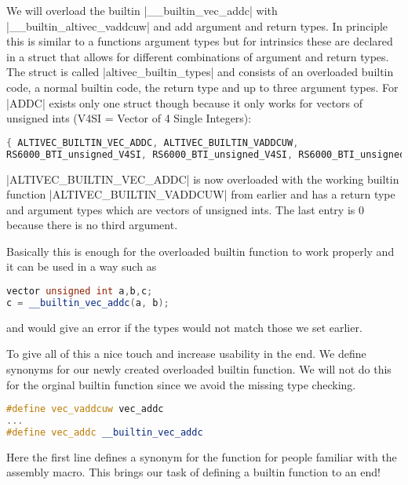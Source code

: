 We will overload the builtin |__builtin_vec_addc| with |__builtin_altivec_vaddcuw| and add argument and return types. In principle this is similar to a functions argument types but for intrinsics these are declared in a struct that allows for different combinations of argument and return types. The struct is called |altivec_builtin_types| and consists of an overloaded builtin code, a normal builtin code, the return type and up to three argument types. For |ADDC| exists only one struct though because it only works for vectors of unsigned ints (V4SI = Vector of 4 Single Integers):
\begin{lstlisting}[language=C++,basicstyle=\ttfamily\scriptsize,keywordstyle=\color{red}]
{ ALTIVEC_BUILTIN_VEC_ADDC, ALTIVEC_BUILTIN_VADDCUW,
RS6000_BTI_unsigned_V4SI, RS6000_BTI_unsigned_V4SI, RS6000_BTI_unsigned_V4SI, 0 }			
\end{lstlisting}
|ALTIVEC_BUILTIN_VEC_ADDC| is now overloaded with the working builtin function |ALTIVEC_BUILTIN_VADDCUW| from earlier and has a return type and argument types which are vectors of unsigned ints. The last entry is 0 because there is no third argument.

Basically this is enough for the overloaded builtin function to work properly and it can be used in a way such as
\begin{lstlisting}[language=C++,basicstyle=\ttfamily\scriptsize,keywordstyle=\color{red}] 
vector unsigned int a,b,c;
c = __builtin_vec_addc(a, b);
\end{lstlisting}
and would give an error if the types would not match those we set earlier.

To give all of this a nice touch and increase usability in the end. We define synonyms for our newly created overloaded builtin function. We will not do this for the orginal builtin function since we avoid the missing type checking.
\begin{lstlisting}[language=C++,basicstyle=\ttfamily\scriptsize,keywordstyle=\color{red}] 
#define vec_vaddcuw vec_addc
...
#define vec_addc __builtin_vec_addc
\end{lstlisting}
Here the first line defines a synonym for the function for people familiar with the assembly macro.
This brings our task of defining a builtin function to an end!

